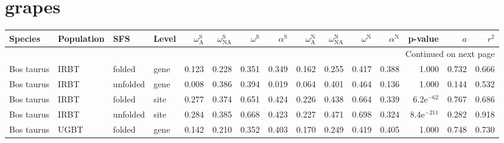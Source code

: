 \newpage\section*{grapes} 
\begin{longtable}{llllrrrrrrrrrrr}
\toprule
             Species &                Population &       SFS & Level & $\omega_{\textrm{A}}^{\textrm{S}}$ & $\omega_{\textrm{NA}}^{\textrm{S}}$ & $\omega^{\textrm{S}}$ & $\alpha^{\textrm{S}}$ & $\omega_{\textrm{A}}^{\textrm{N}}$ & $\omega_{\textrm{NA}}^{\textrm{N}}$ & $\omega^{\textrm{N}}$ & $\alpha^{\textrm{N}}$ &       p-value &    $a$ &  $r^2$ \\
\midrule
\endhead
\midrule
\multicolumn{15}{r}{{Continued on next page}} \\
\midrule
\endfoot

\bottomrule
\endlastfoot
          Bos taurus &                      IRBT &    folded &  gene &                              0.123 &                               0.228 &                 0.351 &                 0.349 &                              0.162 &                               0.255 &                 0.417 &                 0.388 &         1.000 &  0.732 &  0.666 \\
          Bos taurus &                      IRBT &  unfolded &  gene &                              0.008 &                               0.386 &                 0.394 &                 0.019 &                              0.064 &                               0.401 &                 0.464 &                 0.136 &         1.000 &  0.144 &  0.532 \\
          Bos taurus &                      IRBT &    folded &  site &                              0.277 &                               0.374 &                 0.651 &                 0.424 &                              0.226 &                               0.438 &                 0.664 &                 0.339 &  6.2e$^{-62}$ &  0.767 &  0.686 \\
          Bos taurus &                      IRBT &  unfolded &  site &                              0.284 &                               0.385 &                 0.668 &                 0.423 &                              0.227 &                               0.471 &                 0.698 &                 0.324 & 8.4e$^{-211}$ &  0.282 &  0.918 \\
          Bos taurus &                      UGBT &    folded &  gene &                              0.142 &                               0.210 &                 0.352 &                 0.403 &                              0.170 &                               0.249 &                 0.419 &                 0.405 &         1.000 &  0.748 &  0.730 \\

\end{longtable}
